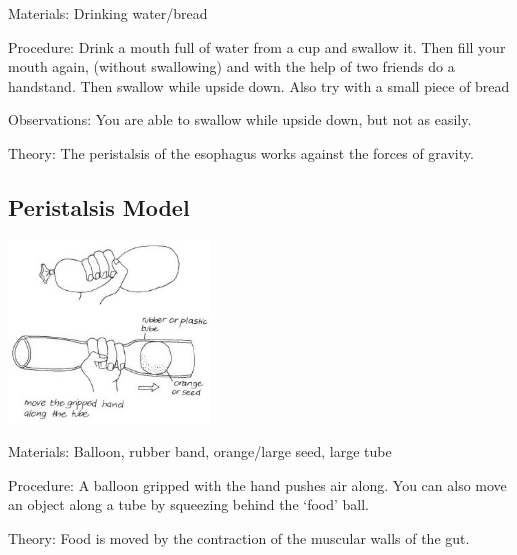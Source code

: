 \begin{multicols}{2}
\begin{description*}
\item[Materials:]{Drinking water/bread}
\item[Procedure:]{Drink a mouth full of water from a cup and swallow it. Then fill your mouth again, (without
swallowing) and with the help of two friends do a handstand. Then swallow while upside down. Also try with a small piece of bread}
\item[Observations:]{You are able to swallow while upside down, but not as easily.}
\item[Theory:]{The peristalsis of the
esophagus works against the forces of gravity.}
\end{description*}

\subsection{Peristalsis Model} %

\begin{center}
\includegraphics[width=0.4\textwidth]{./img/vso/peristalsis-model.jpg}
\end{center}

\begin{description*}
\item[Materials:]{Balloon, rubber band, orange/large seed, large tube}
\item[Procedure:]{A balloon gripped with the hand
pushes air along. You can also
move an object along a tube by
squeezing behind the `food' ball.}
\item[Theory:]{Food is moved by the contraction
of the muscular walls of the gut.}
\end{description*}


\end{multicols}
